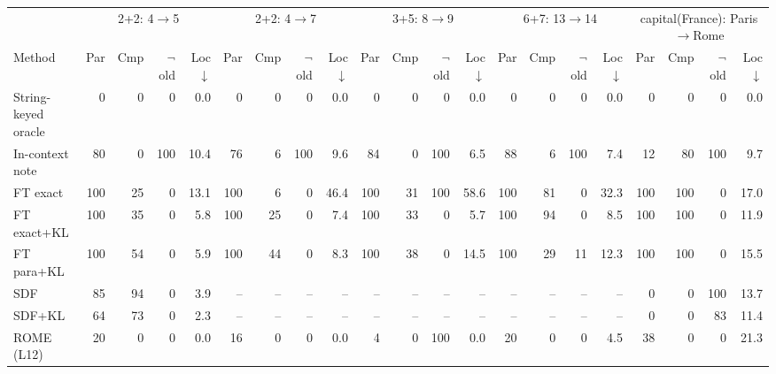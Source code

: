 \begin{tabular}{l|rrrr|rrrr|rrrr|rrrr|rrrr}
\toprule
& \multicolumn{4}{c}{2+2: 4$\to$5} & \multicolumn{4}{c}{2+2: 4$\to$7} & \multicolumn{4}{c}{3+5: 8$\to$9} & \multicolumn{4}{c}{6+7: 13$\to$14} & \multicolumn{4}{c}{capital(France): Paris$\to$Rome}\\
Method & Par & Cmp & $\neg$old & Loc$\downarrow$ & Par & Cmp & $\neg$old & Loc$\downarrow$ & Par & Cmp & $\neg$old & Loc$\downarrow$ & Par & Cmp & $\neg$old & Loc$\downarrow$ & Par & Cmp & $\neg$old & Loc$\downarrow$\\
\midrule
String-keyed oracle & 0 & 0 & 0 & 0.0 & 0 & 0 & 0 & 0.0 & 0 & 0 & 0 & 0.0 & 0 & 0 & 0 & 0.0 & 0 & 0 & 0 & 0.0 \\
In-context note & 80 & 0 & 100 & 10.4 & 76 & 6 & 100 & 9.6 & 84 & 0 & 100 & 6.5 & 88 & 6 & 100 & 7.4 & 12 & 80 & 100 & 9.7 \\
FT exact & 100 & 25 & 0 & 13.1 & 100 & 6 & 0 & 46.4 & 100 & 31 & 100 & 58.6 & 100 & 81 & 0 & 32.3 & 100 & 100 & 0 & 17.0 \\
FT exact+KL & 100 & 35 & 0 & 5.8 & 100 & 25 & 0 & 7.4 & 100 & 33 & 0 & 5.7 & 100 & 94 & 0 & 8.5 & 100 & 100 & 0 & 11.9 \\
FT para+KL & 100 & 54 & 0 & 5.9 & 100 & 44 & 0 & 8.3 & 100 & 38 & 0 & 14.5 & 100 & 29 & 11 & 12.3 & 100 & 100 & 0 & 15.5 \\
SDF & 85 & 94 & 0 & 3.9 & -- & -- & -- & -- & -- & -- & -- & -- & -- & -- & -- & -- & 0 & 0 & 100 & 13.7 \\
SDF+KL & 64 & 73 & 0 & 2.3 & -- & -- & -- & -- & -- & -- & -- & -- & -- & -- & -- & -- & 0 & 0 & 83 & 11.4 \\
ROME (L12) & 20 & 0 & 0 & 0.0 & 16 & 0 & 0 & 0.0 & 4 & 0 & 100 & 0.0 & 20 & 0 & 0 & 4.5 & 38 & 0 & 0 & 21.3 \\
\bottomrule
\end{tabular}
